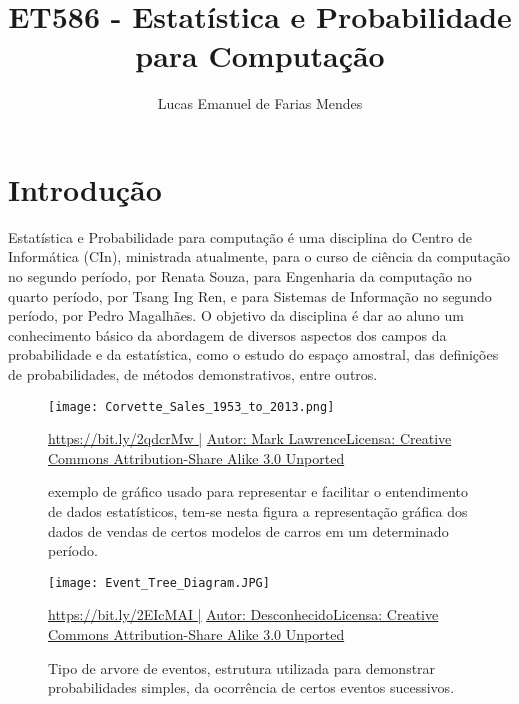 \documentclass[10pt]{extarticle}
\title{ET586 - Estatística e Probabilidade para Computação}
\author{Lucas Emanuel de Farias Mendes}
\begin{document}
 \maketitle
 \section{Introdução} Estatística e Probabilidade para computação é uma disciplina do Centro de Informática (CIn), ministrada atualmente, para o curso de ciência da computação no segundo período, por Renata Souza, para Engenharia da computação no quarto período, por Tsang Ing Ren, e para Sistemas de Informação no segundo período, por Pedro Magalhães. O objetivo da disciplina é dar ao aluno um conhecimento básico da abordagem de diversos aspectos dos campos da probabilidade e da estatística, como o estudo do espaço amostral, das definições de probabilidades, de métodos demonstrativos, entre outros.
 \cite {3}
 \cite {4}
 \cite {5}
 \hspace{\parindent}
 \begin{figure}[h!]
\centering
\texttt{[image: Corvette\_Sales\_1953\_to\_2013.png]}
\caption{exemplo de gráfico usado para representar e facilitar o entendimento de dados estatísticos, tem-se nesta figura a representação gráfica dos dados de vendas de certos modelos de carros em um determinado período. \newline}

\url{https://bit.ly/2qdcrMw |}
\href{https://commons.wikimedia.org/wiki/File:Corvette_Sales_1953_to_2013.png}{Autor: Mark Lawrence\newline Licensa: Creative Commons Attribution-Share Alike 3.0 Unported}
\label{fig:Corvette_Sales_1953_to_2013}\newline\newline
\end{figure}
 \begin{figure}[h!]
\centering
\texttt{[image: Event\_Tree\_Diagram.JPG]}
\caption{Tipo de arvore de eventos, estrutura utilizada para demonstrar probabilidades simples, da ocorrência de certos eventos sucessivos. \newline}

\url{https://bit.ly/2EIcMAI |}
\href{https://commons.wikimedia.org/wiki/File:Event_Tree_Diagram.JPG}{Autor: Desconhecido\newline Licensa: Creative Commons Attribution-Share Alike 3.0 Unported}
\label{fig:Corvette_Sales_1953_to_2013}
\end{figure}
\end{document}

